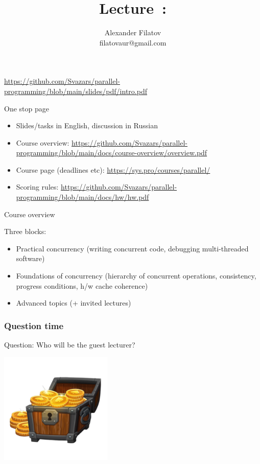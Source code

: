 


\title[]{Lecture~\orgNum: \orgTopic}
\subtitle[]{\orgKey}
\author[]{Alexander Filatov\\ filatovaur@gmail.com}

\date{}

\newcommand{\taskHW}{0.1}




\begin{frame}
  \titlepage

  {\small\url{https://github.com/Svazars/parallel-programming/blob/main/slides/pdf/intro.pdf}}
\end{frame}

\begin{frame}{One stop page}

\begin{itemize}
    \item Slides/tasks in English, discussion in Russian
    \item Course overview: \url{https://github.com/Svazars/parallel-programming/blob/main/docs/course-overview/overview.pdf}
    \item Course page (deadlines etc): \url{https://sys.pro/courses/parallel/}
    \item Scoring rules: \url{https://github.com/Svazars/parallel-programming/blob/main/docs/hw/hw.pdf}
\end{itemize}
\end{frame}

\begin{frame}{Course overview}

Three blocks:
\begin{itemize}
    \item Practical concurrency (writing concurrent code, debugging multi-threaded software)
    \item Foundations of concurrency (hierarchy of concurrent operations, consistency, progress conditions, h/w cache coherence)
    \item Advanced topics (+ invited lectures)
\end{itemize}
\end{frame}

    \begin{frame}
        \frametitle{Question time}
        Question: Who will be the guest lecturer?
        \begin{center}
            \includegraphics[width=0.4\textwidth]{../common/pics/coins.png}
        \end{center}
    \end{frame}

